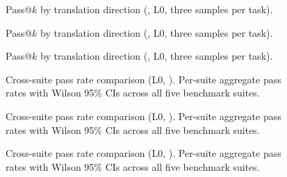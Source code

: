\begin{figure}[!htbp]
\centering

\caption{Pass@$k$ by translation direction (\qwenshort{}, L0, three samples per task).}
\label{fig:pass-at-k-qwen}
\end{figure}

\begin{figure}[!htbp]
\centering

\caption{Pass@$k$ by translation direction (\gptnew{}, L0, three samples per task).}
\label{fig:pass-at-k-gpt54}
\end{figure}

\begin{figure}[!htbp]
\centering

\caption{Pass@$k$ by translation direction (\codex{}, L0, three samples per task).}
\label{fig:pass-at-k-codex}
\end{figure}

\begin{figure}[!htbp]
\centering

\caption{Cross-suite pass rate comparison (L0, \qwenshort{}). Per-suite aggregate pass rates with Wilson 95\% CIs across all five benchmark suites.}
\label{fig:cross-suite-qwen}
\end{figure}

\begin{figure}[!htbp]
\centering

\caption{Cross-suite pass rate comparison (L0, \gptnew{}). Per-suite aggregate pass rates with Wilson 95\% CIs across all five benchmark suites.}
\label{fig:cross-suite-gpt54}
\end{figure}

\begin{figure}[!htbp]
\centering

\caption{Cross-suite pass rate comparison (L0, \codex{}). Per-suite aggregate pass rates with Wilson 95\% CIs across all five benchmark suites.}
\label{fig:cross-suite-codex}
\end{figure}

